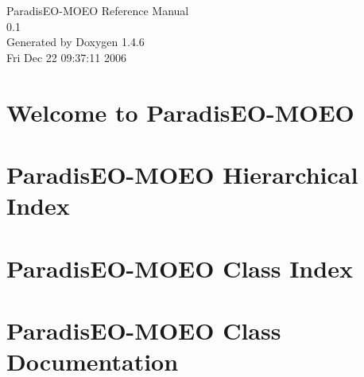 \documentclass[a4paper]{book}
\begin{document}
\begin{titlepage}
\vspace*{7cm}
\begin{center}
{\Large Paradis\-EO-MOEO Reference Manual\\[1ex]\large 0.1 }\\
\vspace*{1cm}
{\large Generated by Doxygen 1.4.6}\\
\vspace*{0.5cm}
{\small Fri Dec 22 09:37:11 2006}\\
\end{center}
\end{titlepage}
\clearemptydoublepage
{}
\tableofcontents
\clearemptydoublepage
{}
\chapter{Welcome to Paradis\-EO-MOEO }
\label{index}
\chapter{Paradis\-EO-MOEO Hierarchical Index}

\chapter{Paradis\-EO-MOEO Class Index}

\chapter{Paradis\-EO-MOEO Class Documentation}




































\printindex
\end{document}
